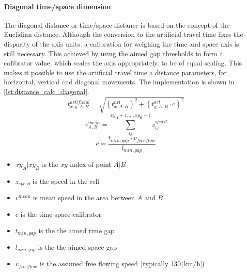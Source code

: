 \paragraph{Diagonal time/space dimension} The diagonal distance or time/space distance is based on the concept of the Euclidian distance. Although the conversion to the artificial travel time fixes the disparity of the axis units, a calibration for weighing the time and space axis is still necessary. This achieved by using the aimed gap thresholds to form a calibrator value, which scales the axis appropriately, to be of equal scaling. This makes it possible to use the artificial travel time a distance parameters, for horizontal, vertical and diagonal movements. The implementation is shown in \cref{lst:distance_calc_diagonal}.
\begin{equation}
	t_{x,y,A,B}^{artificial} = \sqrt{(t_{x,A,B}^{art})^2 + (t_{y,A,B}^{art} \cdot c)^2}
\end{equation}
\begin{equation}
	v_{A,B}^{mean} = \sum_{ij}^{xy_A + 1,...,xy_B - 1} z_{ij}^{speed}
\end{equation}
\begin{equation}
	c = \frac{t_{min,gap} \cdot v_{freeflow}}{l_{min,gap}}
\end{equation}
\begin{itemize}
	\setlength\itemsep{0.1em}	
	\item[] $xy_A | xy_B$ is the $xy$ index of point $A | B$
	\item[] $z_{speed}$ is the speed in the cell
	\item[] $v^{mean}$ is mean speed in the area between $A$ and $B$
	\item[] $c$ is the time-space calibrator
	\item[] $t_{min,gap}$ is the the aimed time gap
	\item[] $l_{min,gap}$ is the the aimed space gap
	\item[] $v_{freeflow}$ is the assumed free flowing speed (typically 130\,[km/h])
\end{itemize}

